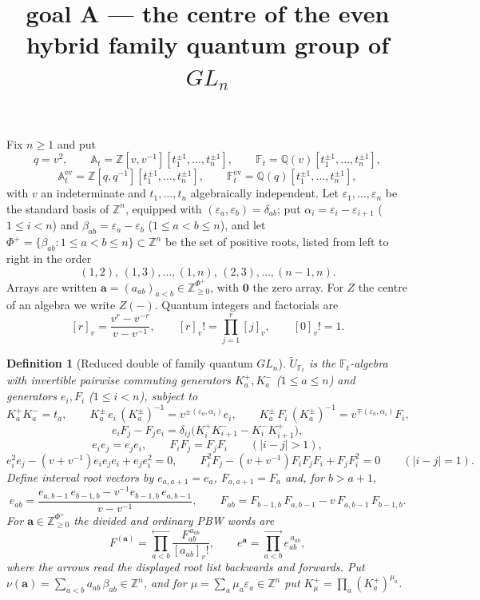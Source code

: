 \documentclass[11pt]{article}
\title{\textbf{goal A} --- the centre of the even hybrid family quantum group of $GL_n$}
\date{}
\newtheorem{definition}{Definition}
\newcommand{\At}{\mathbb A_t}
\newcommand{\Atev}{\mathbb A_t^{\mathrm{ev}}}
\newcommand{\Ft}{\mathbb F_t}
\newcommand{\Ftev}{\mathbb F_t^{\mathrm{ev}}}
\begin{document}
\maketitle

Fix $n\ge 1$ and put
\[
  q=v^{2},\qquad
  \At=\mathbb Z[v,v^{-1}][t_1^{\pm1},\ldots,t_n^{\pm1}],\qquad
  \Ft=\mathbb Q(v)[t_1^{\pm1},\ldots,t_n^{\pm1}],
\]
\[
  \Atev=\mathbb Z[q,q^{-1}][t_1^{\pm1},\ldots,t_n^{\pm1}],\qquad
  \Ftev=\mathbb Q(q)[t_1^{\pm1},\ldots,t_n^{\pm1}],
\]
with $v$ an indeterminate and $t_1,\ldots,t_n$ algebraically independent.
Let $\varepsilon_1,\ldots,\varepsilon_n$ be the standard basis of
$\mathbb Z^{n}$, equipped with $(\varepsilon_a,\varepsilon_b)=\delta_{ab}$;
put $\alpha_i=\varepsilon_i-\varepsilon_{i+1}$ ($1\le i<n$) and
$\beta_{ab}=\varepsilon_a-\varepsilon_b$ ($1\le a<b\le n$), and let
$\Phi^{+}=\{\beta_{ab}:1\le a<b\le n\}\subset\mathbb Z^{n}$ be the set of
positive roots, listed from left to right in the order
\[
  (1,2),\,(1,3),\ldots,(1,n),\,(2,3),\ldots,(n-1,n).
\]
Arrays are written $\mathbf a=(a_{ab})_{a<b}\in\mathbb Z_{\ge0}^{\Phi^{+}}$,
with $\mathbf 0$ the zero array.  For $Z$ the centre of an algebra we write
$Z(-)$.  Quantum integers and factorials are
\[
  [r]_v=\frac{v^{r}-v^{-r}}{v-v^{-1}},\qquad
  [r]_v!=\prod_{j=1}^{r}[j]_v,\qquad
  [0]_v!=1 .
\]

\begin{definition}[Reduced double of family quantum $GL_n$]\label{def:utilde}
$\widetilde U_{\Ft}$ is the $\Ft$-algebra with invertible pairwise commuting
generators $K_a^{+},K_a^{-}$ ($1\le a\le n$) and generators $e_i,F_i$
($1\le i<n$), subject to
\[
  K_a^{+}K_a^{-}=t_a,\qquad
  K_a^{\pm}\,e_i\,(K_a^{\pm})^{-1}=v^{\pm(\varepsilon_a,\alpha_i)}e_i,\qquad
  K_a^{\pm}\,F_i\,(K_a^{\pm})^{-1}=v^{\mp(\varepsilon_a,\alpha_i)}F_i,
\]
\[
  e_iF_j-F_je_i=\delta_{ij}\bigl(K_i^{+}K_{i+1}^{-}-K_i^{-}K_{i+1}^{+}\bigr),
\]
\[
  e_ie_j=e_je_i,\qquad F_iF_j=F_jF_i\qquad(|i-j|>1),
\]
\[
  e_i^{2}e_j-(v+v^{-1})e_ie_je_i+e_je_i^{2}=0,\qquad
  F_i^{2}F_j-(v+v^{-1})F_iF_jF_i+F_jF_i^{2}=0\qquad(|i-j|=1).
\]
Define interval root vectors by $e_{a,a+1}=e_a$, $F_{a,a+1}=F_a$ and, for
$b>a+1$,
\[
  e_{ab}=\frac{e_{a,b-1}\,e_{b-1,b}-v^{-1}e_{b-1,b}\,e_{a,b-1}}{v-v^{-1}},
  \qquad
  F_{ab}=F_{b-1,b}\,F_{a,b-1}-v\,F_{a,b-1}\,F_{b-1,b}.
\]
For $\mathbf a\in\mathbb Z_{\ge0}^{\Phi^{+}}$ the divided and ordinary PBW
words are
\[
  F^{(\mathbf a)}=\prod_{a<b}^{\longleftarrow}\frac{F_{ab}^{\,a_{ab}}}{[a_{ab}]_v!},
  \qquad
  e^{\mathbf a}=\prod_{a<b}^{\longrightarrow}e_{ab}^{\,a_{ab}},
\]
where the arrows read the displayed root list backwards and forwards.  Put
$\nu(\mathbf a)=\sum_{a<b}a_{ab}\,\beta_{ab}\in\mathbb Z^{n}$, and for
$\mu=\sum_a\mu_a\varepsilon_a\in\mathbb Z^{n}$ put
$K^{+}_{\mu}=\prod_a (K_a^{+})^{\mu_a}$.
\end{definition}
\end{document}
